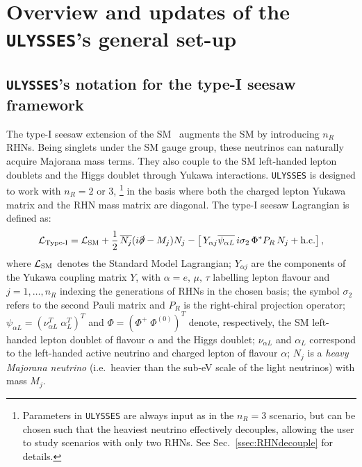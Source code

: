 \documentclass[12pt, a4paper]{article}
\begin{document}
\section{Overview and updates of the \texttt{ULYSSES}'s general set-up}\label{sec:setup}
\subsection{\texttt{ULYSSES}'s notation for the type-I seesaw framework}
The type-I seesaw extension of the SM~\cite{Minkowski:1977sc,Yanagida:1979as,GellMann:1980vs,Glashow:1979nm,Mohapatra:1979ia} augments the SM by introducing $n_R$
RHNs. Being singlets under the SM gauge group, these neutrinos can naturally acquire Majorana mass terms. They also couple to the SM left-handed lepton doublets and the Higgs doublet through Yukawa interactions. \texttt{ULYSSES} is designed to work with $n_R = 2$ or $3$, 
\footnote{Parameters in \texttt{ULYSSES} are always input as in the $n_R=3$ scenario, but can be chosen such that the heaviest neutrino effectively decouples, allowing the user to study scenarios with only two RHNs. See Sec.~\ref{ssec:RHNdecouple} for details.} in the basis where both the charged lepton Yukawa matrix and the RHN mass matrix are diagonal. The type-I seesaw Lagrangian is defined as:
\begin{equation}
{\cal L}_{\text{Type-I}} ={\cal L}_{\rm SM} + \frac{1}{2} \,\overline{N_{j}}(i\slashed{\partial}-M_j)N_{j} 
-\left[
 \,Y_{\alpha j} \overline{\psi_{\alpha L}}\,i\sigma_2\,\Phi^*P_R\,N_{j}
 + \hbox{h.c.}\right], 
\end{equation}
where $\mathcal{L}_{\rm SM}$ denotes the Standard Model Lagrangian; $Y_{\alpha j}$ are the components of the Yukawa coupling matrix $Y$, with $\alpha = e,\,\mu,\,\tau$ labelling lepton flavour and $j = 1, \ldots, n_R$ %
indexing the generations of RHNs in the chosen basis; the symbol $\sigma_2$ refers to the second Pauli matrix and $P_R$ is the right-chiral projection operator; $\psi_{\alpha L} = (\nu_{\alpha L}^T\;\alpha_L^T)^T$ and $\Phi = (\Phi^+\;\Phi^{(0)})^T$ denote, respectively, the SM left-handed lepton doublet of flavour $\alpha$ and the Higgs doublet; $\nu_{\alpha L}$ and $\alpha_L$ correspond to the left-handed active neutrino and charged lepton 
of flavour $\alpha$; $N_j$
is a \textit{heavy Majorana neutrino} (i.e.~heavier than the sub-eV scale of the light neutrinos) 
with mass $M_j$. 
\end{document}
